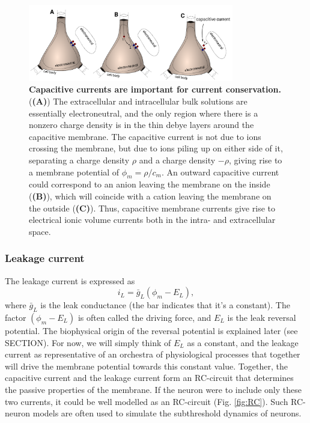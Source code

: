 \begin{figure}[!ht]
\begin{center}
\includegraphics[width=0.8\textwidth]{Fig02/capacitive_currents.pdf}
\end{center}
\caption{\textbf{Capacitive currents are important for current conservation.}  (\textbf{(A)}) The extracellular and intracellular bulk solutions are essentially electroneutral, and the only region where there is a nonzero charge density is in the thin debye layers around the capacitive membrane. The capacitive current is not due to ions crossing the membrane, but due to ions piling up on either side of it, separating a charge density $\rho$ and a charge density $-\rho$, giving rise to a membrane potential of $\phi_m = \rho/c_m$. An outward capacitive current could correspond to an anion leaving the membrane on the inside (\textbf{(B)}), which will coincide with a cation leaving the membrane on the outside (\textbf{(C)}). Thus, capacitive membrane currents give rise to electrical ionic volume currents both in the intra- and extracellular space. 
}
\label{fig:capacitive_currents}
\end{figure}


\subsubsection{Leakage current}
The leakage current is expressed as
\begin{equation}
i_L = \bar{g}_L (\phi_m - E_L),
\label{eq:HHleak}
\end{equation}
where $\bar{g}_L$ is the leak conductance (the bar indicates that it's a constant). The factor $(\phi_m - E_L)$ is often called the driving force, and $E_L$ is the leak reversal potential. The biophysical origin of the reversal potential is explained later (see SECTION). For now, we will simply think of $E_L$ as a constant, and the leakage current as representative of an orchestra of physiological processes that together will drive the membrane potential towards this constant value. Together, the capacitive current and the leakage current form an RC-circuit that determines the passive properties of the membrane. If the neuron were to include only these two currents, it could be well modelled as an RC-circuit (Fig. \ref{fig:RC}). Such RC-neuron models are often used to simulate the subthreshold dynamics of neurons.

